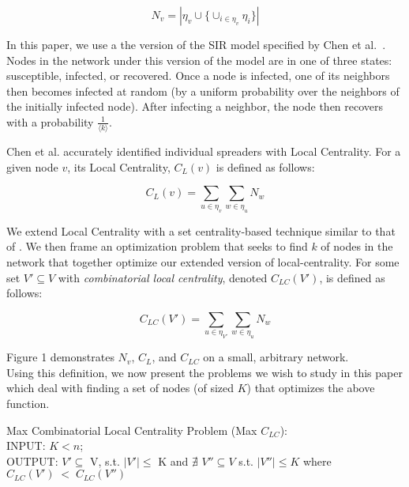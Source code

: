 \begin{equation} 
N_v = |\eta_v \cup \{\cup_{i \in \eta_v} \eta_i\}| 
\end{equation}

In this paper, we use a the version of the SIR model specified by Chen et al.~\cite{chen12}.   Nodes in the network under this version of the model are in one of three states: susceptible, infected, or recovered.  Once a node is infected, one of its neighbors then becomes infected at random (by a uniform probability over the neighbors of the initially infected node).  After infecting a neighbor, the node then recovers with a probability $\frac{1}{\langle k \rangle}$.

Chen et al. accurately identified individual spreaders with Local Centrality.  For a given node $v$, its Local Centrality, $C_L(v)$ is defined as follows:

\begin{equation}
\label{chenEqn}
C_L(v) = \sum_{u \in \eta_v} \sum_{w \in \eta_u} N_w
\end{equation}

We extend Local Centrality with a set centrality-based technique similar to that of \cite{bog06,arroyo08}.  We then frame an optimization problem that seeks to find $k$ of nodes in the network that together optimize our extended version of local-centrality.  For some set $V' \subseteq V$ with \textit{combinatorial local centrality}, denoted $C_{LC}(V')$, is defined as follows:

\begin{equation} 
\label{clcEqn}
C_{LC}(V') = \sum_{u \in \eta_{V'}} \sum_{w \in \eta_u} N_w
\end{equation}

Figure 1 demonstrates $N_v$, $C_L$, and $C_{LC}$ on a small, arbitrary network. \\

Using this definition, we now present the problems we wish to study in this paper which deal with finding a set of nodes (of sized $K$) that optimizes the above function.

\begin{define} Max Combinatorial Local Centrality Problem (Max $C_{LC}$): \\ 
INPUT: $K < n$; \\
OUTPUT: $V' \subseteq$ V, s.t. $|V'| \leq$ K and $ \nexists$ $V'' \subseteq V$ s.t. $|V''| \leq K$ where $C_{LC}(V') \; < \; C_{LC}(V'')$ \end{define}

